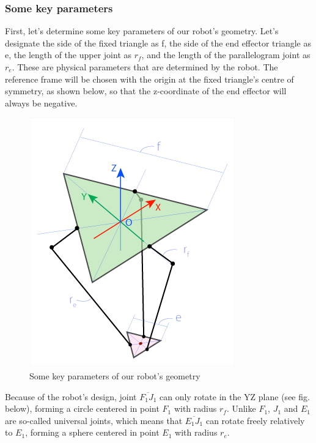 \subsubsection{Some key parameters}
First, let's determine some key parameters of our robot's geometry. Let's designate the side of the fixed triangle as f, the side of the end effector triangle as e, the length of the upper joint as $r_{f}$,  and the length of the parallelogram joint as $r_{e}$. These are physical parameters that are determined by the robot. The reference frame will be chosen with the origin at the fixed triangle's centre of symmetry, as shown below, so that the z-coordinate of the end effector will always be negative.
\begin{figure}[H]
	\centering
	\includegraphics[width=\maxwidth{15cm}, keepaspectratio]{Chapters/Fig/key_parameters.png}
	\caption{Some key parameters of our robot's geometry}
	\label{fig:key_parameters}
\end{figure}
Because of the robot's design, joint $\overline{F_{1}J_{1}}$ can only rotate in the YZ plane (see fig. below), forming a circle centered in point $F_{1}$ with radius $r_{f}$. Unlike $F_{1}$, $J_{1}$ and $E_{1}$ are so-called universal joints, which means that $\overline{E_{1}J_{1}}$ can rotate freely relatively to $E_{1}$, forming a sphere centered in point $E_{1}$ with radius $r_{e}$.
